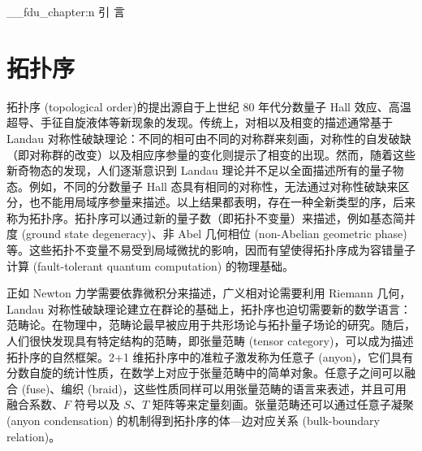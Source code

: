 \ExplSyntaxOn
\__fdu_chapter:n { 引 \quad 言 }
\ExplSyntaxOff

\begingroup

\renewcommand{\thesection}{\arabic{section}}

\section{拓扑序}

拓扑序 (topological order)\cite{wen1990topological,wen2013topological,wen2017colloquium,zeng2019introduction}的提出源自于上世纪 80 年代分数量子 Hall 效应\cite{tsui1982two,laughlin1983anomalous}、高温超导、手征自旋液体\cite{kalmeyer1987equivalence,wen1989chiral}等新现象的发现。传统上，对相以及相变的描述通常基于 Landau 对称性破缺理论：不同的相可由不同的对称群来刻画，对称性的自发破缺（即对称群的改变）以及相应序参量的变化则提示了相变的出现\cite{landau1980statistical,pathria2011statistical}。然而，随着这些新奇物态的发现，人们逐渐意识到 Landau 理论并不足以全面描述所有的量子物态。例如，不同的分数量子 Hall 态具有相同的对称性，无法通过对称性破缺来区分，也不能用局域序参量来描述\cite{stone1992quantum}。以上结果都表明，存在一种全新类型的序，后来称为拓扑序。拓扑序可以通过新的量子数（即拓扑不变量）来描述，例如基态简并度 (ground state degeneracy)\cite{wen1989vacuum,wen1990ground}、非 Abel 几何相位 (non-Abelian geometric phase)\cite{wen1990topological}等。这些拓扑不变量不易受到局域微扰的影响，因而有望使得拓扑序成为容错量子计算 (fault-tolerant quantum computation) 的物理基础\cite{kitaev2003fault,freedman2003topological,nayak2008nonabelian}。

正如 Newton 力学需要依靠微积分来描述，广义相对论需要利用 Riemann 几何，Landau 对称性破缺理论建立在群论的基础上，拓扑序也迫切需要新的数学语言：范畴论。在物理中，范畴论最早被应用于共形场论\cite{segal1988definition,moore1989classical}与拓扑量子场论\cite{atiyah1988topological,turaev1992state}的研究。随后，人们很快发现具有特定结构的范畴，即张量范畴 (tensor category)，可以成为描述拓扑序的自然框架\cite{levin2005string,kitaev2006anyons}。2+1 维拓扑序中的准粒子激发称为任意子 (anyon)，它们具有分数自旋的统计性质，在数学上对应于张量范畴中的简单对象。任意子之间可以融合 (fuse)、编织 (braid)，这些性质同样可以用张量范畴的语言来表述，并且可用融合系数、$F$ 符号以及 $S$、$T$ 矩阵等来定量刻画\cite{bakalov2001lectures,kitaev2006anyons,bruillard2016rank,aasen2020topological}。张量范畴还可以通过任意子凝聚 (anyon condensation) 的机制得到拓扑序的体—边对应关系 (bulk-boundary relation)\cite{kong2014anyon,kong2014braided,kong2015boundary,kong2017boundary,lou2021dummy}。

